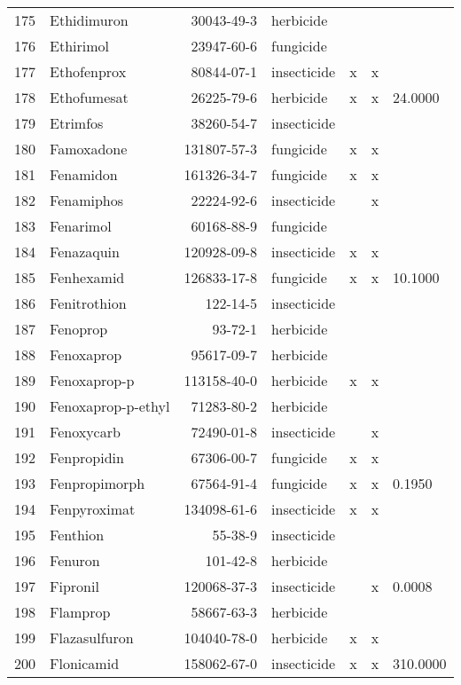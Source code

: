 \begin{longtable}{lp{4cm}rlp{1.3cm}p{1.3cm}p{1.5cm}}
  175 & Ethidimuron & 30043-49-3 & herbicide &  &  &  \\ 
  176 & Ethirimol & 23947-60-6 & fungicide &  &  &  \\ 
  177 & Ethofenprox & 80844-07-1 & insecticide & x & x &  \\ 
  178 & Ethofumesat & 26225-79-6 & herbicide & x & x & 24.0000 \\ 
  179 & Etrimfos & 38260-54-7 & insecticide &  &  &  \\ 
  180 & Famoxadone & 131807-57-3 & fungicide & x & x &  \\ 
  181 & Fenamidon & 161326-34-7 & fungicide & x & x &  \\ 
  182 & Fenamiphos & 22224-92-6 & insecticide &  & x &  \\ 
  183 & Fenarimol & 60168-88-9 & fungicide &  &  &  \\ 
  184 & Fenazaquin & 120928-09-8 & insecticide & x & x &  \\ 
  185 & Fenhexamid & 126833-17-8 & fungicide & x & x & 10.1000 \\ 
  186 & Fenitrothion & 122-14-5 & insecticide &  &  &  \\ 
  187 & Fenoprop & 93-72-1 & herbicide &  &  &  \\ 
  188 & Fenoxaprop & 95617-09-7 & herbicide &  &  &  \\ 
  189 & Fenoxaprop-p & 113158-40-0 & herbicide & x & x &  \\ 
  190 & Fenoxaprop-p-ethyl & 71283-80-2 & herbicide &  &  &  \\ 
  191 & Fenoxycarb & 72490-01-8 & insecticide &  & x &  \\ 
  192 & Fenpropidin & 67306-00-7 & fungicide & x & x &  \\ 
  193 & Fenpropimorph & 67564-91-4 & fungicide & x & x & 0.1950 \\ 
  194 & Fenpyroximat & 134098-61-6 & insecticide & x & x &  \\ 
  195 & Fenthion & 55-38-9 & insecticide &  &  &  \\ 
  196 & Fenuron & 101-42-8 & herbicide &  &  &  \\ 
  197 & Fipronil & 120068-37-3 & insecticide &  & x & 0.0008 \\ 
  198 & Flamprop & 58667-63-3 & herbicide &  &  &  \\ 
  199 & Flazasulfuron & 104040-78-0 & herbicide & x & x &  \\ 
  200 & Flonicamid & 158062-67-0 & insecticide & x & x & 310.0000 \\ 

\end{longtable}
